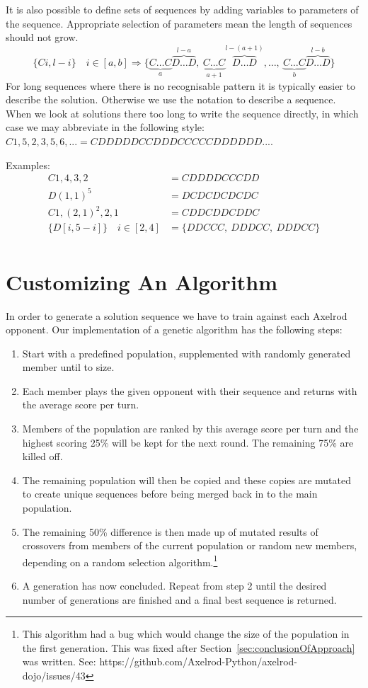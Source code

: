 It is also possible to define sets of sequences by adding variables to parameters of the sequence.
Appropriate selection of parameters mean the length of sequences should not grow.
\[ \{Ci,l-i\} \quad i\in [a,b] \Rightarrow \{\underbrace{C\ldots C}_{a}\overbrace{D\ldots D}^{l-a},\ \underbrace{C\ldots C}_{a+1}\overbrace{D\ldots D}^{l-(a+1)},\ldots ,\ \underbrace{C\ldots C}_{b}\overbrace{D\ldots D}^{l-b}\} \]
For long sequences where there is no recognisable pattern it is typically easier to describe the solution.
Otherwise we use the notation to describe a sequence.
When we look at solutions there too long to write the sequence directly, in which case we may abbreviate in the following style: $C1,5,2,3,5,6,...=CDDDDDCCDDDCCCCCDDDDDD...$.

Examples:
\begin{align}
    C1,4,3,2 &= CDDDDCCCDD\\
    D(1,1)^{5} &= DCDCDCDCDC\\
    C1,(2,1)^{2},2,1 &= CDDCDDCDDC\\
    \{D[i,5-i]\} \quad i\in [2,4] &= \{DDCCC,\ DDDCC,\ DDDCC\}\\
\end{align}

\section{Customizing An Algorithm}\label{sec:buildingTheAlgorithm}
In order to generate a solution sequence we have to train against each Axelrod opponent.
Our implementation of a genetic algorithm has the following steps:
\begin{enumerate}
    \item Start with a predefined population, supplemented with randomly generated member until to size.
    \item Each member plays the given opponent with their sequence and returns with the average score per turn.
    \item Members of the population are ranked by this average score per turn and the highest scoring 25\% will be kept for the next round.
    The remaining 75\% are killed off.
    \item The remaining population will then be copied and these copies are mutated to create unique sequences before being merged back in to the main population.
    \item The remaining 50\% difference is then made up of mutated results of crossovers from members of the current population or random new members, depending on a random selection algorithm.\footnote{This algorithm had a bug which would change the size of the population in the first generation.
    This was fixed after Section~\ref{sec:conclusionOfApproach} was written.
    See: https://github.com/Axelrod-Python/axelrod-dojo/issues/43}
    \item A generation has now concluded.
    Repeat from step 2 until the desired number of generations are finished and a final best sequence is returned.
\end{enumerate}

